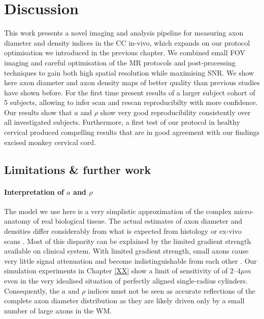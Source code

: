 \section{Discussion}
This work presents a novel imaging and analysis pipeline for measuring axon diameter and density indices in the CC in-vivo, which expands on our \SFasym{} protocol optimisation we introduced in the previous chapter. We combined small FOV imaging and careful optimisation of the MR protocols and post-processing techniques to gain both high spatial resolution while maximising SNR. We show here axon diameter and axon density maps of better quality than previous studies have shown before. For the first time present results of a larger subject cohort of 5 subjects, allowing to infer scan and rescan reproducibilty with more confidence. Our results show that $a$ and $\rho$ show very good reproducibility consistently over all investigated subjects. Furthermore, a first test of our protocol in healthy cervical produced compelling results that are in good agreement with our findings excised monkey cervical cord.

\subsection*{Limitations \& further work}
\paragraph{Interpretation of $a$ and $\rho$}The model we use here is a very simplistic approximation of the complex micro-anatomy of real biological tissue. The actual estimates of axon diameter and densities differ considerably from what is expected from histology or ex-vivo scans \citep{Alexander:2010}. Most of this disparity can be explained by the limited gradient strength available on clinical system.  With limited gradient strength, small axons cause very little signal attenuation and become indistinguishable from each other \citep{Laett:2007,Yeh:2010}. Our simulation experiments in Chapter \ref{XX} show a limit of sensitivity of of 2--4$\mu m$ even in the very idealised situation of perfectly aligned single-radius cylinders. Consequently, the $a$ and $\rho$ indices must not be seen as accurate reflections of the complete axon diameter distribution as they are likely driven only by a small number of large axons in the WM. 

